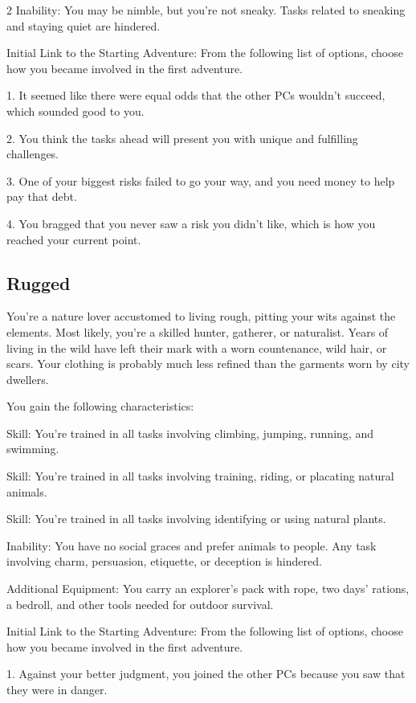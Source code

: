 \begin{multicols}{2}
Inability: You may be nimble, but you’re not sneaky. Tasks related to sneaking and staying quiet are hindered.

Initial Link to the Starting Adventure: From the following list of options, choose how you became involved in the first adventure.

1. It seemed like there were equal odds that the other PCs wouldn’t succeed, which sounded good to you.

2. You think the tasks ahead will present you with unique and fulfilling challenges.

3. One of your biggest risks failed to go your way, and you need money to help pay that debt.

4. You bragged that you never saw a risk you didn’t like, which is how you reached your current point.

\subsection{Rugged}

You’re a nature lover accustomed to living rough, pitting your wits against the elements. Most likely, you’re a skilled hunter, gatherer, or naturalist. Years of living in the wild have left their mark with a worn countenance, wild hair, or scars. Your clothing is probably much less refined than the garments worn by city dwellers.

You gain the following characteristics:

Skill: You’re trained in all tasks involving climbing, jumping, running, and swimming.

Skill: You’re trained in all tasks involving training, riding, or placating natural animals.

Skill: You’re trained in all tasks involving identifying or using natural plants.

Inability: You have no social graces and prefer animals to people. Any task involving charm, persuasion, etiquette, or deception is hindered.

Additional Equipment: You carry an explorer’s pack with rope, two days’ rations, a bedroll, and other tools needed for outdoor survival.

Initial Link to the Starting Adventure: From the following list of options, choose how you became involved in the first adventure.

1. Against your better judgment, you joined the other PCs because you saw that they were in danger.


\end{multicols}
